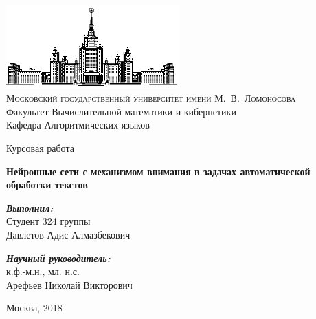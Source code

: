 \begin{titlepage}
\begin{center}
\ \vspace{-2.5cm}

\includegraphics[width=0.5\textwidth]{msu.eps}\\
{\scshape Московский государственный университет имени М.~В.~Ломоносова}\\
Факультет Вычислительной математики и кибернетики\\
Кафедра Алгоритмических языков
\vfill

\begin{LARGE}
	Курсовая работа
\end{LARGE}

\vspace{1cm}

\begin{Huge}
\bfseries{Нейронные сети с механизмом внимания в задачах автоматической обработки текстов}
\end{Huge}

\vspace{1cm}


\end{center}

\vspace{1cm}

\begin{flushright}
  \large
  \textit{\bf Выполнил:}\\
  Студент 324 группы \\
  Давлетов Адис Алмазбекович
  
  \vspace{5mm}
  \textit{\bf Научный руководитель:}\\
  к.ф.-м.н., мл. н.с.\\
  Арефьев Николай Викторович

\end{flushright}

\vfill

\begin{center}
Москва, 2018
\end{center}

\end{titlepage}
\setcounter{page}{2}
